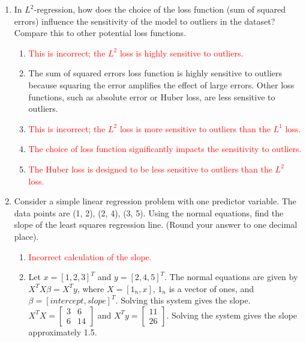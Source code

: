 \documentclass{article}%
\newcommand{\incorrect}[1]{\textcolor{red}{#1}}
\begin{document}
\begin{enumerate}
\begin{enumerate}
\item \incorrect{The loss function is never set to zero; it is minimized. The normal equations form a system of equations, not a single equation.}%
\item \incorrect{The normal equations are fundamental to solving the $L^2$-regression problem.}%
\end{enumerate}%
\vspace{1em}%
\item In $L^2$-regression, how does the choice of the loss function (sum of squared errors) influence the sensitivity of the model to outliers in the dataset? Compare this to other potential loss functions.%
\begin{enumerate}%
\item \incorrect{This is incorrect; the $L^2$ loss is highly sensitive to outliers.}%
\item The sum of squared errors loss function is highly sensitive to outliers because squaring the error amplifies the effect of large errors.  Other loss functions, such as absolute error or Huber loss, are less sensitive to outliers.%
\item \incorrect{This is incorrect; the $L^2$ loss is more sensitive to outliers than the $L^1$ loss.}%
\item \incorrect{The choice of loss function significantly impacts the sensitivity to outliers.}%
\item \incorrect{The Huber loss is designed to be less sensitive to outliers than the $L^2$ loss.}%
\end{enumerate}%
\vspace{1em}%
\item Consider a simple linear regression problem with one predictor variable.  The data points are (1, 2), (2, 4), (3, 5).  Using the normal equations, find the slope of the least squares regression line. (Round your answer to one decimal place).%
\begin{enumerate}%
\item \incorrect{Incorrect calculation of the slope.}%
\item Let $x = [1, 2, 3]^T$ and $y = [2, 4, 5]^T$. The normal equations are given by $X^TX\beta = X^Ty$, where $X = [1_n, x]$, $1_n$ is a vector of ones, and $\beta = [intercept, slope]^T$.  Solving this system gives the slope.  $X^TX = \begin{bmatrix} 3 & 6 \\ 6 & 14 \end{bmatrix}$ and $X^Ty = \begin{bmatrix} 11 \\ 26 \end{bmatrix}$. Solving the system gives the slope approximately 1.5.%

\end{enumerate}
\end{enumerate}
\end{document}
